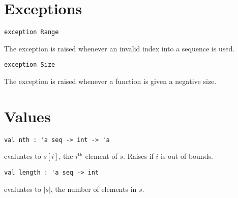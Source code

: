 \section{Exceptions}
\label{sec:seq-interface::exceptions}

\begin{cluster}
\label{grp:grm:seq-interface::exception}

\begin{gram}
\label{grm:seq-interface::exception}
\begin{verbatim}
exception Range
\end{verbatim}
The  exception is raised whenever an invalid index into a sequence is used.

\end{gram}
\end{cluster}

\begin{cluster}
\label{grp:grm:seq-interface::size}

\begin{gram}
\label{grm:seq-interface::size}
\begin{verbatim}
exception Size
\end{verbatim}
The  exception is raised whenever a function is given a negative size.

\end{gram}
\end{cluster}


\section{Values}
\label{sec:seq-interface::values}

\begin{cluster}
\label{grp:gr:nth}

\begin{gram}[nth]
\label{gr:nth}
\begin{verbatim}
val nth : 'a seq -> int -> 'a
\end{verbatim}
 evaluates to $s[i]$, the $i^\text{th}$ element of $s$.
Raises  if $i$ is out-of-bounds.

\end{gram}
\end{cluster}

\begin{cluster}
\label{grp:gr:length}

\begin{gram}[length]
\label{gr:length}
\begin{verbatim}
val length : 'a seq -> int
\end{verbatim}
 evaluates to $|s|$, the number of elements in $s$.

\end{gram}
\end{cluster}


